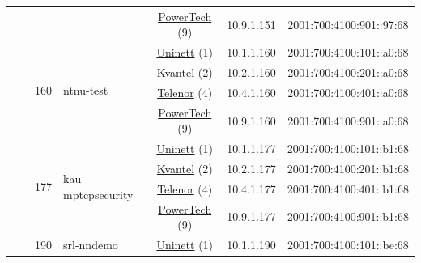 \begin{small}
\begin{center}
\begin{longtable}{|c|c|c|c|c|c|c|c|}
  &  &  &  & \multicolumn{2}{|c|}{\tiny{\href{http://www.powertech.no}{PowerTech} (9)}} & \tiny{10.9.1.151} & \tiny{2001:700:4100:901::97:68} \\* \cline{3-3}\cline{4-4}\cline{5-5}\cline{6-6}\cline{7-7}\cline{8-8}
  &  & \multirow{4}{*}{\tiny{160}} & \multicolumn{1}{|l|}{\multirow{4}{*}{\tiny{ntnu-test}}} & \multicolumn{2}{|c|}{\tiny{\href{https://www.uninett.no}{Uninett} (1)}} & \tiny{10.1.1.160} & \tiny{2001:700:4100:101::a0:68} \\* \cline{5-5}\cline{6-6}\cline{7-7}\cline{8-8}
  &  &  &  & \multicolumn{2}{|c|}{\tiny{\href{http://kvantel.no}{Kvantel} (2)}} & \tiny{10.2.1.160} & \tiny{2001:700:4100:201::a0:68} \\* \cline{5-5}\cline{6-6}\cline{7-7}\cline{8-8}
  &  &  &  & \multicolumn{2}{|c|}{\tiny{\href{https://www.telenor.no}{Telenor} (4)}} & \tiny{10.4.1.160} & \tiny{2001:700:4100:401::a0:68} \\* \cline{5-5}\cline{6-6}\cline{7-7}\cline{8-8}
  &  &  &  & \multicolumn{2}{|c|}{\tiny{\href{http://www.powertech.no}{PowerTech} (9)}} & \tiny{10.9.1.160} & \tiny{2001:700:4100:901::a0:68} \\* \cline{3-3}\cline{4-4}\cline{5-5}\cline{6-6}\cline{7-7}\cline{8-8}
  &  & \multirow{4}{*}{\tiny{177}} & \multicolumn{1}{|l|}{\multirow{4}{*}{\tiny{kau-mptcpsecurity}}} & \multicolumn{2}{|c|}{\tiny{\href{https://www.uninett.no}{Uninett} (1)}} & \tiny{10.1.1.177} & \tiny{2001:700:4100:101::b1:68} \\* \cline{5-5}\cline{6-6}\cline{7-7}\cline{8-8}
  &  &  &  & \multicolumn{2}{|c|}{\tiny{\href{http://kvantel.no}{Kvantel} (2)}} & \tiny{10.2.1.177} & \tiny{2001:700:4100:201::b1:68} \\* \cline{5-5}\cline{6-6}\cline{7-7}\cline{8-8}
  &  &  &  & \multicolumn{2}{|c|}{\tiny{\href{https://www.telenor.no}{Telenor} (4)}} & \tiny{10.4.1.177} & \tiny{2001:700:4100:401::b1:68} \\* \cline{5-5}\cline{6-6}\cline{7-7}\cline{8-8}
  &  &  &  & \multicolumn{2}{|c|}{\tiny{\href{http://www.powertech.no}{PowerTech} (9)}} & \tiny{10.9.1.177} & \tiny{2001:700:4100:901::b1:68} \\* \cline{3-3}\cline{4-4}\cline{5-5}\cline{6-6}\cline{7-7}\cline{8-8}
  &  & \multirow{4}{*}{\tiny{190}} & \multicolumn{1}{|l|}{\multirow{4}{*}{\tiny{srl-nndemo}}} & \multicolumn{2}{|c|}{\tiny{\href{https://www.uninett.no}{Uninett} (1)}} & \tiny{10.1.1.190} & \tiny{2001:700:4100:101::be:68} \\* \cline{5-5}\cline{6-6}\cline{7-7}\cline{8-8}

\end{longtable}
\end{center}
\end{small}
